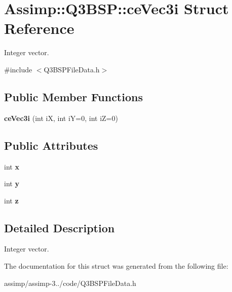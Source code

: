\hypertarget{struct_assimp_1_1_q3_b_s_p_1_1ce_vec3i}{\section{Assimp\+:\+:Q3\+B\+S\+P\+:\+:ce\+Vec3i Struct Reference}
\label{struct_assimp_1_1_q3_b_s_p_1_1ce_vec3i}
}


Integer vector.  




{\ttfamily \#include $<$Q3\+B\+S\+P\+File\+Data.\+h$>$}

\subsection*{Public Member Functions}
\begin{DoxyCompactItemize}
\item 
\hypertarget{struct_assimp_1_1_q3_b_s_p_1_1ce_vec3i_a229171abb48bcf32d6e1cc0f5f554dec}{{\bfseries ce\+Vec3i} (int i\+X, int i\+Y=0, int i\+Z=0)}\label{struct_assimp_1_1_q3_b_s_p_1_1ce_vec3i_a229171abb48bcf32d6e1cc0f5f554dec}

\end{DoxyCompactItemize}
\subsection*{Public Attributes}
\begin{DoxyCompactItemize}
\item 
\hypertarget{struct_assimp_1_1_q3_b_s_p_1_1ce_vec3i_a6a686eb623a46bcef572fd919a55954f}{int {\bfseries x}}\label{struct_assimp_1_1_q3_b_s_p_1_1ce_vec3i_a6a686eb623a46bcef572fd919a55954f}

\item 
\hypertarget{struct_assimp_1_1_q3_b_s_p_1_1ce_vec3i_aec8750bc1f8ac9314f7565c4f91785a3}{int {\bfseries y}}\label{struct_assimp_1_1_q3_b_s_p_1_1ce_vec3i_aec8750bc1f8ac9314f7565c4f91785a3}

\item 
\hypertarget{struct_assimp_1_1_q3_b_s_p_1_1ce_vec3i_a101895822b7b272da82a9f6052c68d13}{int {\bfseries z}}\label{struct_assimp_1_1_q3_b_s_p_1_1ce_vec3i_a101895822b7b272da82a9f6052c68d13}

\end{DoxyCompactItemize}


\subsection{Detailed Description}
Integer vector. 

The documentation for this struct was generated from the following file\+:\begin{DoxyCompactItemize}
\item 
assimp/assimp-\/3../code/Q3\+B\+S\+P\+File\+Data.\+h\end{DoxyCompactItemize}
